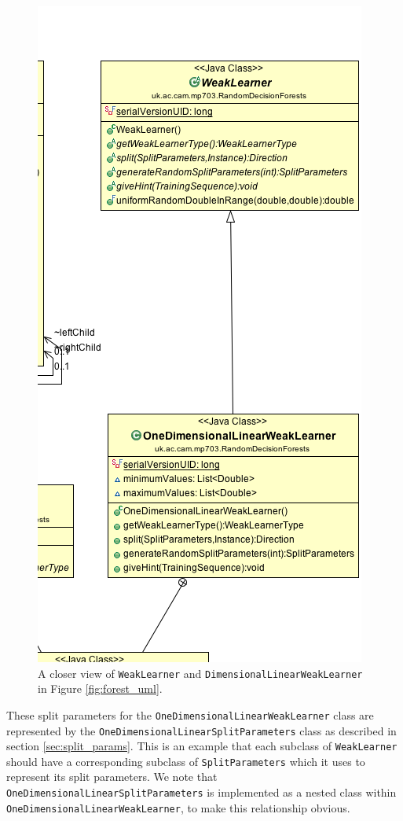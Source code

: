 \documentclass[12pt,twoside,notitlepage]{report}
\begin{document}
                \begin{figure}[H]
                    \centering
                    \includegraphics[scale=0.6]{WeakLearner_Forest_UML}
                    \caption[A closer view of \texttt{WeakLearner} and \texttt{DimensionalLinearWeakLearner}]{A closer view of \texttt{WeakLearner} and 
                    \texttt{DimensionalLinearWeakLearner} in Figure \ref{fig:forest_uml}.}
                    \label{fig:weak_learner_uml}
                \end{figure}

                These split parameters for the \texttt{OneDimensionalLinearWeakLearner} class are represented by the 
                \texttt{OneDimensionalLinearSplitParameters} class as described in section \ref{sec:split_params}. This 
                is an example that each subclass of \texttt{WeakLearner} should have a corresponding subclass of 
                \texttt{SplitParameters} which it uses to represent its split parameters. We note that 
                \texttt{OneDimensionalLinearSplitParameters} is implemented as a nested class within 
                \texttt{OneDimensionalLinearWeakLearner}, to make this relationship obvious.
\end{document}
